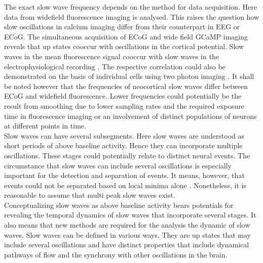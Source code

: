 The exact slow wave frequency depends on the method for data acquisition. Here data from widefield fluorescence imaging is analysed. This raises the question how slow oscillations in calcium imaging differ from their counterpart in EEG or ECoG. The simultaneous acquisition of ECoG and wide field GCaMP imaging reveals that up states cooccur with oscillations in the cortical potential. Slow waves in the mean fluorescence signal cooccur with slow waves in the electrophysiological recording \parencite{stroh2013making}. The respective correlation could also be demonstrated on the basis of individual cells using two photon imaging \parencite{niethard2018cortical}. It shall be noted however that the frequencies of neocortical slow waves differ between ECoG and widefield fluorescence. Lower frequencies could potentially be the result from smoothing due to lower sampling rates and the required exposure time in fluorescence imaging or an involvement of distinct populations of neurons at different points in time.\\
Slow waves can have several subsegments. Here slow waves are understood as short periods of above baseline activity. Hence they can incorporate multiple oscillations. These stages could potentially relate to distinct neural events. The circumstance that slow waves can include several oscillations is especially important for the detection and separation of events. It means, however, that events could not be separated based on local minima alone \parencite{celotto2020analysis}. Nonetheless, it is reasonable to assume that multi peak slow waves exist.\\
Conceptualizing slow waves as above baseline activity bears potentials for revealing the temporal dynamics of slow waves that incorporate several stages. It also means that new methods are required for the analysis the dynamic of slow waves. Slow waves can be defined in various ways. They are up states that may include several oscillations and have distinct properties that include dynamical pathways of flow and the synchrony with other oscillations in the brain.
